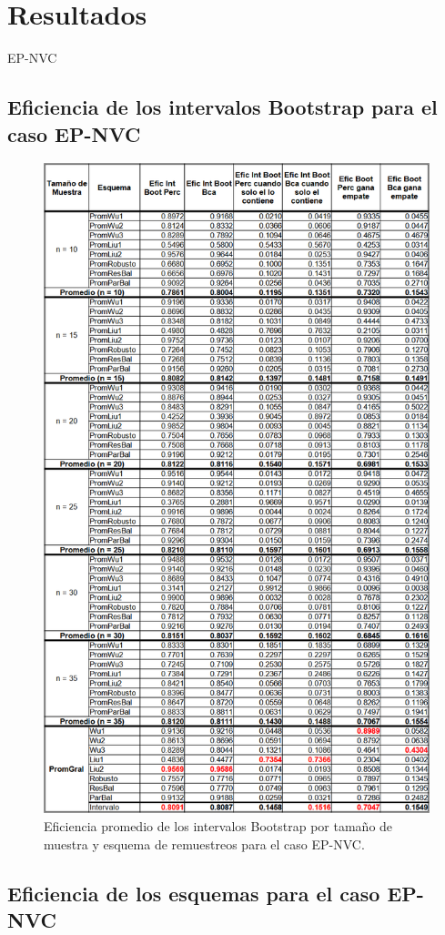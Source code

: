 \section{Resultados}

EP-NVC
\subsection{Eficiencia de los intervalos Bootstrap para el caso EP-NVC}

\begin{figure}[ht] 
	\centering 
	\includegraphics[width=0.75\linewidth]{img/EP_NVC_Efic_Boots.png} 
	\caption{Eficiencia promedio de los intervalos Bootstrap por tamaño de muestra y esquema de remuestreos para el caso EP-NVC.} 
	\label{fig:EP_NVC_Boots}
\end{figure}

\subsection{Eficiencia de los esquemas para el caso EP-NVC}

